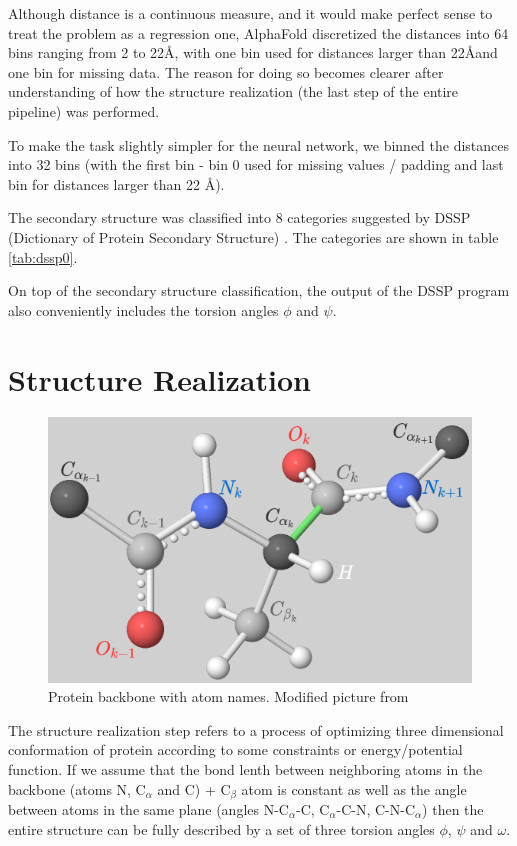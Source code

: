 Although distance is a continuous measure, and it would make perfect sense to treat the problem as a regression one, AlphaFold discretized the distances into 64 bins ranging from 2 to 22\AA, with one bin used for distances larger than 22\AA and one bin for missing data. 
The reason for doing so becomes clearer after understanding of how the structure realization (the last step of the entire pipeline) was performed.

To make the task slightly simpler for the neural network, we binned the distances into 32 bins (with the first bin - bin 0 used for missing values / padding and last bin for distances larger than 22 \AA).
        
The secondary structure was classified into 8 categories suggested by DSSP (Dictionary of Protein Secondary Structure) \cite{dssp1, dssp2, dssp3}. 
The categories are shown in table \ref{tab:dssp0}.

On top of the secondary structure classification, the output of the DSSP program also conveniently includes the torsion angles $\phi$ and $\psi$.
        


\section{Structure Realization}

\begin{figure}
    \centering
    \includegraphics[scale=0.5]{imgs_tomas/backbone.png}
    \caption{Protein backbone with atom names. Modified picture from \cite{ramachandran}}
    \label{fig:backbone}
\end{figure}

The structure realization step refers to a process of optimizing three dimensional conformation of protein according to some constraints or energy/potential function. If we assume that the bond lenth between neighboring atoms in the backbone (atoms N, C$_\alpha$ and C) + C$_\beta$ atom is constant as well as the angle between atoms in the same plane (angles N-C$_{\alpha}$-C, C$_{\alpha}$-C-N, C-N-C$_{\alpha}$) then the entire structure can be fully described by a set of three torsion angles $\phi$, $\psi$ and $\omega$.

